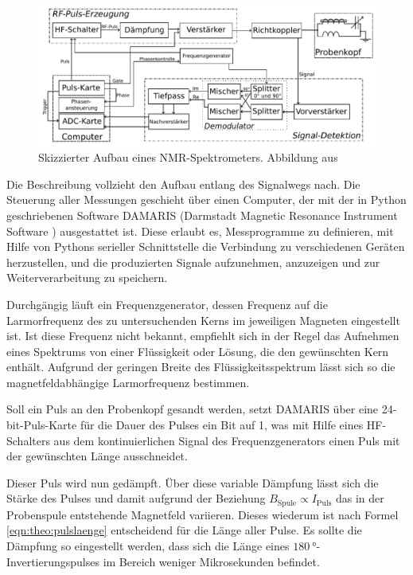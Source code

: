 \begin{figure}
	\begin{center}
		\includegraphics[width=\textwidth]{graphics/joachim/aufbau.pdf} 
	\end{center}
	\caption{Skizzierter Aufbau eines NMR-Spektrometers. Abbildung aus \cite[S. 29]{lueg_implementierung_2016}} \label{fig:exp:aufbau}
\end{figure}

Die Beschreibung vollzieht den Aufbau entlang des Signalwegs nach. Die Steuerung aller Messungen geschieht über einen Computer, der mit der in Python geschriebenen Software DAMARIS (Darmstadt Magnetic Resonance Instrument Software \cite{gadke_damaris_2007}) ausgestattet ist. Diese erlaubt es, Messprogramme zu definieren, mit Hilfe von Pythons serieller Schnittstelle die Verbindung zu verschiedenen Geräten herzustellen, und die produzierten Signale aufzunehmen, anzuzeigen und zur Weiterverarbeitung zu speichern.

Durchgängig läuft ein Frequenzgenerator, dessen Frequenz auf die Larmorfrequenz des zu untersuchenden Kerns im jeweiligen Magneten eingestellt ist. Ist diese Frequenz nicht bekannt, empfiehlt sich in der Regel das Aufnehmen eines Spektrums von einer Flüssigkeit oder Lösung, die den gewünschten Kern enthält. Aufgrund der geringen Breite des Flüssigkeitsspektrum lässt sich so die magnetfeldabhängige Larmorfrequenz bestimmen.

Soll ein Puls an den Probenkopf gesandt werden, setzt DAMARIS über eine 24-bit-Puls-Karte für die Dauer des Pulses ein Bit auf 1, was mit Hilfe eines HF-Schalters aus dem kontinuierlichen Signal des Frequenzgenerators einen Puls mit der gewünschten Länge ausschneidet.

Dieser Puls wird nun gedämpft. Über diese variable Dämpfung lässt sich die Stärke des Pulses und damit aufgrund der Beziehung $B_\text{Spule} \propto I_\text{Puls}$ das in der Probenspule entstehende Magnetfeld variieren. Dieses wiederum ist nach Formel \eqref{eqn:theo:pulslaenge} entscheidend für die Länge aller Pulse. Es sollte die Dämpfung so eingestellt werden, dass sich die Länge eines $\SI{180}{\degree}$-Invertierungspulses im Bereich weniger Mikrosekunden befindet.


